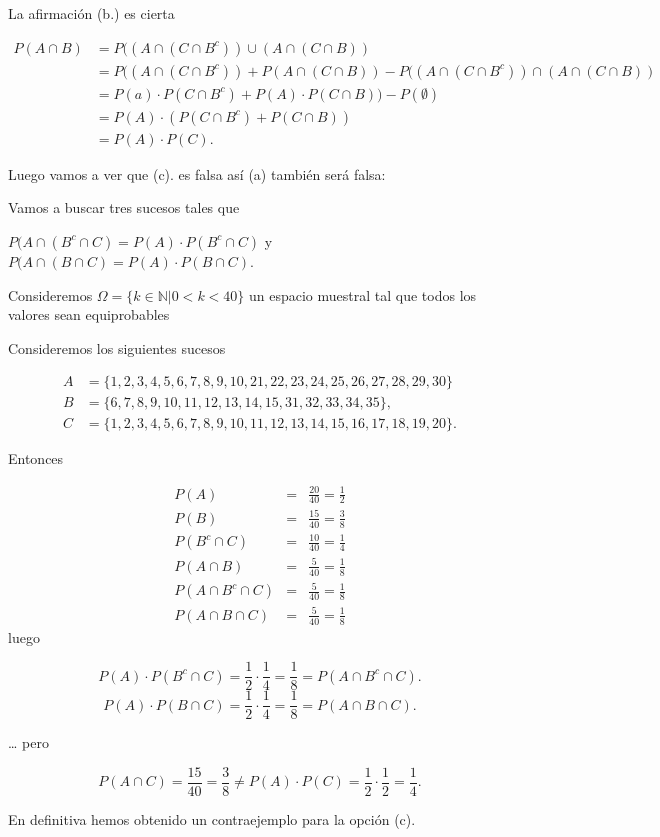 \documentclass[
]{article}
\begin{document}
La afirmación (b.) es cierta

\[
\begin{aligned}
P(A\cap B)&=P((A\cap(C\cap B^c))\cup (A\cap (C\cap B))\\
 &=P((A\cap(C\cap B^c))+P(A\cap (C\cap B))-P((A\cap(C\cap B^c))\cap (A\cap (C\cap B))\\
 &=P(a)\cdot P(C\cap B^c)+P(A)\cdot  P(C\cap B))-P(\emptyset)\\
 &=P(A)\cdot (P(C\cap B^c)+P(C\cap B))\\
 &  =  P(A)\cdot P(C).
\end{aligned}
\]

Luego vamos a ver que (c). es falsa así (a) también será falsa:

Vamos a buscar tres sucesos tales que

\(P(A\cap (B^c\cap C)=P(A)\cdot P(B^c\cap C)\) y
\(P(A\cap (B\cap C)=P(A)\cdot P(B\cap C)\).

Consideremos \(\Omega=\{k\in \mathbb{N}| 0< k< 40\}\) un espacio
muestral tal que todos los valores sean equiprobables

Consideremos los siguientes sucesos

\[
\begin{aligned}
A & = \{1,2,3,4,5,6,7,8,9,10,21,22,23,24,25,26,27,28,29,30\}\\
B & = \{6,7,8,9,10,11,12,13,14,15,31,32,33,34,35\},\\
C & = \{1,2,3,4,5,6,7,8,9,10,11,12,13,14,15,16,17,18,19,20\}.
\end{aligned}
\]

Entonces

\[
\begin{aligned}
P(A) & =& \frac{20}{40}=\frac12\\
P(B) & =& \frac{15}{40}=\frac38\\
P(B^c\cap C) & =& \frac{10}{40}=\frac14\\
P(A\cap B) & =& \frac{5}{40}=\frac18\\
P(A\cap B^c\cap C) & =& \frac{5}{40}=\frac18\\
P(A\cap B\cap C) & =& \frac{5}{40}=\frac18
\end{aligned}
\] luego

\[P(A) \cdot P(B^c\cap C)=\frac12\cdot\frac14=\frac18=P(A\cap B^c\cap C).\]
\[P(A) \cdot P(B\cap C)=\frac12\cdot\frac14=\frac18=P(A\cap B\cap C).\]

\ldots{} pero

\[P(A\cap C)=\frac{15}{40}=\frac38\neq P(A)\cdot P(C)=\frac12\cdot \frac12=\frac14.\]

En definitiva hemos obtenido un contraejemplo para la opción (c).
\end{document}
